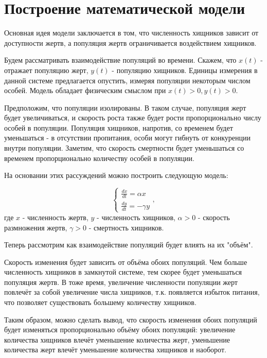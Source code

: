 \chapter{Построение математической модели}
Основная идея модели заключается в том, что численность хищников зависит от доступности жертв, а популяция жертв ограничивается воздействием хищников. 

Будем рассматривать взаимодействие популяций во времени. Скажем, что $x(t)$ - отражает популяцию жерт, $y(t)$ - популяцию хищников. Единицы измерения в данной системе предлагается опустить, измеряя популяции некоторым числом особей. Модель обладает физическим смыслом при $x(t) > 0, y(t) > 0$.

Предположим, что популяции изолированы. В таком случае, популяция жерт будет увеличиваться, и скорость роста также будет рости пропорционально числу особей в популяции. 
Популяция хищников, напротив, со временем будет уменьшаться - в отсутствии пропитания, особи могут гибнуть от конкуренции внутри популяции. Заметим, что скорость смертности будет уменьшаться со временем пропорционально количеству особей в популяции.

На основании этих рассуждений можно построить следующую модель:


	\begin{equation}
		\begin{cases}
			\frac{dx}{dt} = \alpha x \\
			\frac{dy}{dt} = -\gamma y
		\end{cases},
		\label{eq:basic_model}
	\end{equation}
где $x$ - численность жертв, $y$ - численность хищников, $\alpha > 0$ - скорость размножения жертв,  $\gamma > 0$ - смертность хищников.

Теперь рассмотрим как взаимодействие популяций будет влиять на их "объём".

Скорость изменения будет зависить от объёма обоих популяций. Чем больше численность хищников в замкнутой системе, тем скорее будет уменьшаться популяция жертв.
В тоже время, увеличение численности популяции жерт повлечёт за собой увеличение числа хищников, т.к. появляется избыток питания, что позволяет существовать большему количеству хищников.

Таким образом, можно сделать вывод, что скорость изменения обоих популяций будет изменяться пропорционально объёму обоих популяций: увеличение количества хищников влечёт уменьшение количества жерт, уменьшение количества жерт влечёт уменьшение количества хищников и наоборот.

